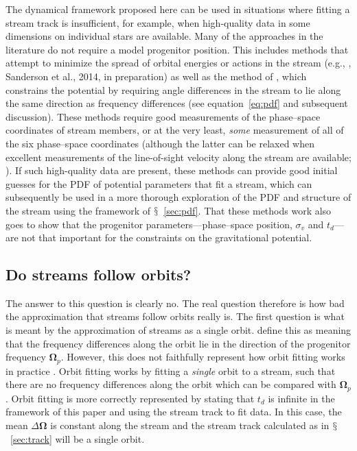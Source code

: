 \documentclass[12pt,preprint]{aastex}
\newcommand{\etal}{et al.}
\newcommand{\eg}{e.g.}
\newcommand{\eqnname}{equation}
\newcommand{\equationname}{\eqnname}
\newcommand{\sectionname}{$\mathsection$}
\renewcommand{\vec}[1]{\ensuremath{\mathbf{#1}}}
\newcommand{\veco}{\ensuremath{\vec{\Omega}}}
\newcommand{\sigv}{\ensuremath{\sigma_v}}
\begin{document}
The dynamical framework proposed here can be used in situations where
fitting a stream track is insufficient, for example, when high-quality
data in some dimensions on individual stars are available. Many of the
approaches in the literature do not require a model progenitor
position. This includes methods that attempt to minimize the spread of
orbital energies or actions in the stream (\eg,
\citealt{Binney08a,Penarrubia12a}, Sanderson \etal, 2014, in
preparation) as well as the method of \citet{Sanders13b}, which
constrains the potential by requiring angle differences in the stream
to lie along the same direction as frequency differences (see
\equationname~\ref{eq:pdf} and subsequent discussion). These methods
require good measurements of the phase--space coordinates of stream
members, or at the very least, \emph{some} measurement of all of the
six phase--space coordinates (although the latter can be relaxed when
excellent measurements of the line-of-sight velocity along the stream
are available; \citealt{Binney08a}). If such high-quality data are
present, these methods can provide good initial guesses for the PDF of
potential parameters that fit a stream, which can subsequently be used
in a more thorough exploration of the PDF and structure of the stream
using the framework of \sectionname~\ref{sec:pdf}. That these methods
work also goes to show that the progenitor parameters---phase--space
position, $\sigv$ and $t_d$---are not that important for the
constraints on the gravitational potential.

\subsection{Do streams follow orbits?}\label{sec:discussorbit}

The answer to this question is clearly no. The real question therefore
is how bad the approximation that streams follow orbits really is. The
first question is what is meant by the approximation of streams as a
single orbit. \citet{Sanders13a} define this as meaning that the
frequency differences along the orbit lie in the direction of the
progenitor frequency $\veco_p$. However, this does not faithfully
represent how orbit fitting works in practice
\citep[\eg,][]{Koposov10a}. Orbit fitting works by fitting a
\emph{single} orbit to a stream, such that there are no frequency
differences along the orbit which can be compared with
$\veco_p$. Orbit fitting is more correctly represented by stating that
$t_d$ is infinite in the framework of this paper and using the stream
track to fit data. In this case, the mean $\Delta \veco$ is constant
along the stream and the stream track calculated as in
\sectionname~\ref{sec:track} will be a single orbit.
\end{document}
